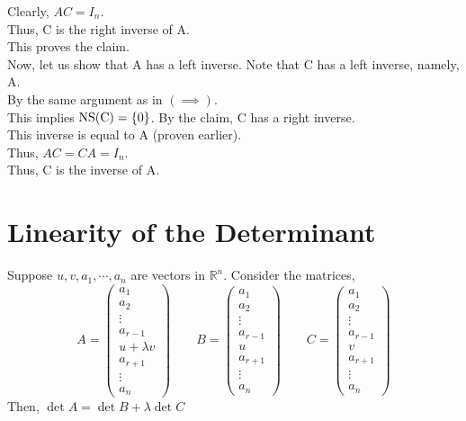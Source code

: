 \documentclass[12pt]{article}
\begin{document}
\begin{prf}{}
Clearly, \(AC = I_n\).\\
Thus, C is the right inverse of A.\\
This proves the claim.\\
Now, let us show that A has a left inverse. Note that C has a left inverse, namely, A.\\
By the same argument as in \(\left(\implies\right)\).\\
This implies \(\rm{NS}(C) = \{0\}\). By the claim, C has a right inverse.\\
This inverse is equal to A (proven earlier).\\
Thus, \(AC = CA = I_n\).\\
Thus, C is the inverse of A.
\end{prf}

\section{Linearity of the Determinant}
\begin{theo}{}
Suppose \(u, v, a_1, \cdots, a_n\) are vectors in \(\mathbb R^n\). Consider the matrices,
\[
A = \begin{pmatrix}
    a_1\\ a_2 \\ \vdots \\ a_{r-1} \\ u + \lambda v \\ a_{r+1} \\ \vdots \\ a_n
\end{pmatrix}  
\qquad
B = \begin{pmatrix}
    a_1\\ a_2 \\ \vdots \\ a_{r-1} \\ u \\ a_{r+1} \\ \vdots \\ a_n
\end{pmatrix} 
\qquad
C = \begin{pmatrix}
    a_1\\ a_2 \\ \vdots \\ a_{r-1} \\ v \\ a_{r+1} \\ \vdots \\ a_n
\end{pmatrix} 
\]
Then, \(\det A = \det B + \lambda \det C\)
\end{theo}
\end{document}
